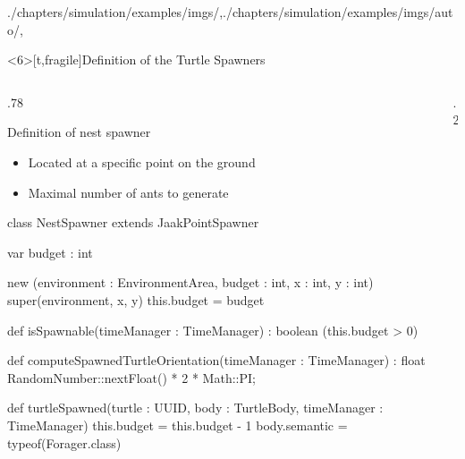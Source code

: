 \begin{graphicspathcontext}{{./chapters/simulation/examples/imgs/},{./chapters/simulation/examples/imgs/auto/},\old}
\begin{frame}<6>[t,fragile]{Definition of the Turtle Spawners \insertcontinuationtext}
	\vspace{-.5cm}
	\smaller
	\begin{columns}
		\begin{column}[t]{.78\linewidth}
			\begin{block}{Definition of nest spawner}
				\begin{itemize}
				\item Located at a specific point on the ground
				\item Maximal number of ants to generate
				\end{itemize}
			\end{block}
			\begin{sarllisting}[basicstyle=\tiny]
class NestSpawner extends JaakPointSpawner {
  var budget : int

  new (environment : EnvironmentArea, budget : int, x : int, y : int) {
    super(environment, x, y)
    this.budget = budget
  }

  def isSpawnable(timeManager : TimeManager) : boolean {
    (this.budget > 0)
  }

  def computeSpawnedTurtleOrientation(timeManager : TimeManager) : float {
    RandomNumber::nextFloat() * 2 * Math::PI;
  }

  def turtleSpawned(turtle : UUID, body : TurtleBody,
                    timeManager : TimeManager) {
    this.budget = this.budget - 1
    body.semantic = typeof(Forager.class)
  }
}
			\end{sarllisting}
		\end{column}
		\begin{column}[t]{.2\linewidth}
		\end{column}
	\end{columns}
\end{frame}


\end{graphicspathcontext}
